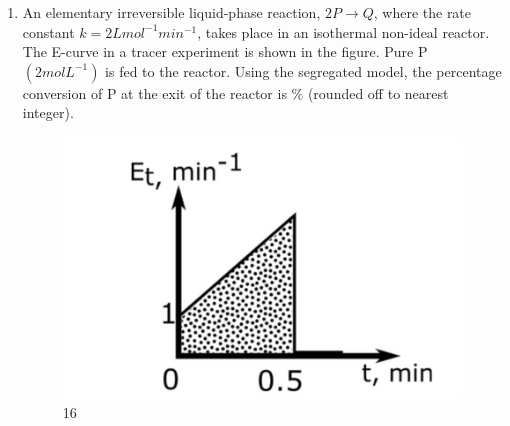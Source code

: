 \documentclass[journal]{IEEEtran}
\numberwithin{equation}{enumi}
\numberwithin{figure}{enumi}
\begin{document}
\begin{enumerate}[start=1, label={Q\arabic*.}]
\vspace{0.2cm}
\item An elementary irreversible liquid-phase reaction, $2P \rightarrow Q$, where the rate constant $k=2Lmol^{-1} min^{-1}$, takes place in an isothermal non-ideal reactor. The E-curve in a tracer experiment is shown in the figure. Pure P $(2mol L^{-1})$ is fed to the reactor. Using the segregated model, the percentage conversion of P at the exit of the reactor is \underline{\hspace{1.5cm}}$\%$ (rounded off to nearest integer).
\begin{figure}[H]
    \centering
    \includegraphics[width=0.5\linewidth]{figs/fig16.jpeg}
    \caption{16}
    \label{fig:16}
\end{figure}



  
\end{enumerate}
\end{document}
